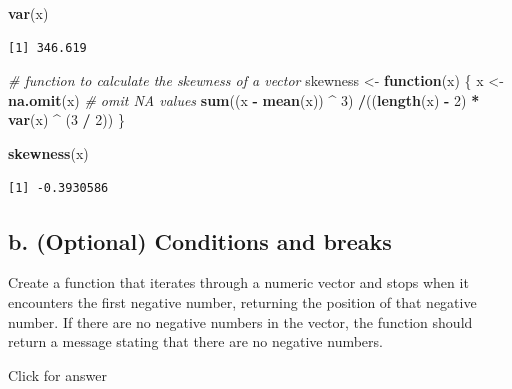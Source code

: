 \documentclass[
]{book}
\newenvironment{Shaded}{\begin{snugshade}}{\end{snugshade}}
\newcommand{\CommentTok}[1]{\textcolor[rgb]{0.56,0.35,0.01}{\textit{#1}}}
\newcommand{\ControlFlowTok}[1]{\textcolor[rgb]{0.13,0.29,0.53}{\textbf{#1}}}
\newcommand{\DecValTok}[1]{\textcolor[rgb]{0.00,0.00,0.81}{#1}}
\newcommand{\FunctionTok}[1]{\textcolor[rgb]{0.13,0.29,0.53}{\textbf{#1}}}
\newcommand{\NormalTok}[1]{#1}
\newcommand{\OtherTok}[1]{\textcolor[rgb]{0.56,0.35,0.01}{#1}}
\newcommand{\SpecialCharTok}[1]{\textcolor[rgb]{0.81,0.36,0.00}{\textbf{#1}}}
\begin{document}
\begin{Shaded}
\begin{Highlighting}[]
\FunctionTok{var}\NormalTok{(x)}
\end{Highlighting}
\end{Shaded}

\begin{verbatim}
[1] 346.619
\end{verbatim}

\begin{Shaded}
\begin{Highlighting}[]
\CommentTok{\# function to calculate the skewness of a vector}
\NormalTok{skewness }\OtherTok{\textless{}{-}} \ControlFlowTok{function}\NormalTok{(x) \{}
\NormalTok{  x }\OtherTok{\textless{}{-}} \FunctionTok{na.omit}\NormalTok{(x) }\CommentTok{\# omit NA values}
  \FunctionTok{sum}\NormalTok{((x }\SpecialCharTok{{-}} \FunctionTok{mean}\NormalTok{(x)) }\SpecialCharTok{\^{}} \DecValTok{3}\NormalTok{) }\SpecialCharTok{/}\NormalTok{((}\FunctionTok{length}\NormalTok{(x) }\SpecialCharTok{{-}} \DecValTok{2}\NormalTok{) }\SpecialCharTok{*} \FunctionTok{var}\NormalTok{(x) }\SpecialCharTok{\^{}}\NormalTok{ (}\DecValTok{3} \SpecialCharTok{/} \DecValTok{2}\NormalTok{))}
\NormalTok{\}}
\end{Highlighting}
\end{Shaded}

\begin{Shaded}
\begin{Highlighting}[]
\FunctionTok{skewness}\NormalTok{(x)}
\end{Highlighting}
\end{Shaded}

\begin{verbatim}
[1] -0.3930586
\end{verbatim}

\hypertarget{b.-optional-conditions-and-breaks}{%
\subsection{b. (Optional) Conditions and breaks}\label{b.-optional-conditions-and-breaks}}

Create a function that iterates through a numeric vector and stops when it encounters the first negative number, returning the position of that negative number. If there are no negative numbers in the vector, the function should return a message stating that there are no negative numbers.

Click for answer
\end{document}
